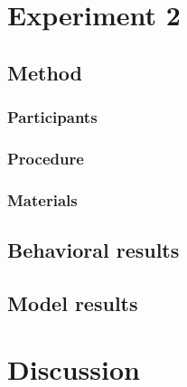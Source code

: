 \documentclass[10pt,letterpaper]{article}
\begin{document}
\section{Experiment 2}

\subsection{Method}
\subsubsection{Participants}
\subsubsection{Procedure}
\subsubsection{Materials}

\subsection{Behavioral results}

\subsection{Model results}



\section{Discussion}



\setlength{\bibleftmargin}{.125in}
\setlength{\bibindent}{-\bibleftmargin}


\end{document}
